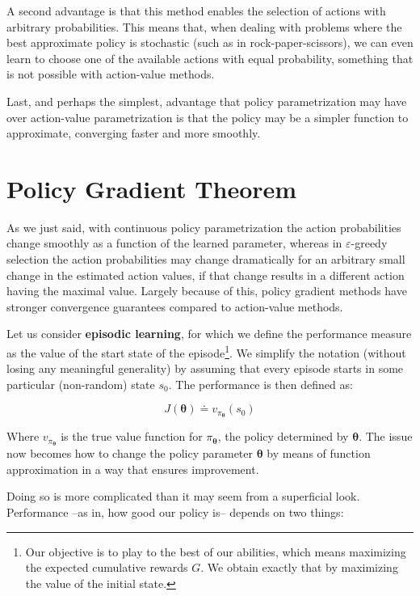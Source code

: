 A second advantage is that this method enables the selection of actions with arbitrary probabilities. This means that, when dealing with problems where the best approximate policy is stochastic (such as in rock-paper-scissors), we can even learn to choose one of the available actions with equal probability, something that is not possible with action-value methods.

Last, and perhaps the simplest, advantage that policy parametrization may have over action-value parametrization is that the policy may be a simpler function to approximate, converging faster and more smoothly.

\section{Policy Gradient Theorem}
As we just said, with continuous policy parametrization the action probabilities change smoothly as a function of the learned parameter, whereas in $\varepsilon$-greedy selection the action probabilities may change dramatically for an arbitrary small change in the estimated action values, if that change results in a different action having the maximal value. Largely because of this, policy gradient methods have stronger convergence guarantees compared to action-value methods.

Let us consider \textbf{episodic learning}, for which we define the performance measure as the value of the start state of the episode\footnote{Our objective is to play to the best of our abilities, which means maximizing the expected cumulative rewards $G$. We obtain exactly that by maximizing the value of the initial state.}. We simplify the notation (without losing any meaningful generality) by assuming that every episode starts in some particular (non-random) state $s_0$. The performance is then defined as:

\begin{equation*}
    J(\boldsymbol{\theta}) \doteq v_{\pi_{\boldsymbol{\theta}}}(s_0)
\end{equation*}

Where $v_{\pi_{\boldsymbol{\theta}}}$ is the true value function for $\pi_{\boldsymbol{\theta}}$, the policy determined by $\boldsymbol{\theta}$. The issue now becomes how to change the policy parameter $\boldsymbol{\theta}$ by means of function approximation in a way that ensures improvement.

Doing so is more complicated than it may seem from a superficial look. Performance --as in, how good our policy is-- depends on two things:

